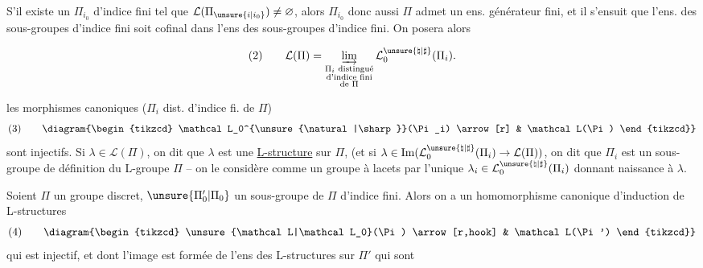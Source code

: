 S'il existe un $\Pi_{i_0}$ d'indice fini tel que
$\mathcal L(\Pi_{\unsure{i|i_0}})\ne\varnothing$, alors $\Pi_{i_0}$ donc aussi $\Pi$ admet
un ens. générateur fini, et il s'ensuit
que l'ens. des sous-groupes  d'indice fini
soit cofinal dans l'ens des sous-groupes
d'indice fini. On posera alors

\[
\text{(2)}\qquad
\mathcal L(\Pi)=
\varinjlim_{\substack{\Pi_i\text{ distingué}\\
\text{d'indice fini}\\
\text{de }\Pi}}
\mathcal L_0^{\unsure{\natural|\sharp}}(\Pi_i).
\]


les morphismes canoniques ($\Pi_i$ dist. d'indice fi.
de $\Pi$)
\[
\text{(3)}\qquad
\diagram{\begin{tikzcd}
\mathcal L_0^{\unsure{\natural|\sharp}}(\Pi_i) \arrow[r] & \mathcal L(\Pi)
\end{tikzcd}}
\]
sont injectifs. Si $\lambda\in\mathcal L(\Pi)$, on dit que
$\lambda$ est une \uline{L-structure} sur $\Pi$,
(et si
$\lambda\in\operatorname{Im}(\mathcal L_0^{\unsure{\natural|\sharp}}(\Pi_i)\to\mathcal L(\Pi))$,
on dit que $\Pi_i$ est
un sous-groupe de définition du L-groupe
$\Pi$ -- on le considère comme un
groupe à lacets par l'unique $\lambda_i\in\mathcal L_0^{\unsure{\natural|\sharp}}(\Pi_i)$
donnant naissance à $\lambda$.

Soient $\Pi$ un groupe discret, $\unsure{\Pi'_0|\Pi_0}$ un
sous-groupe de $\Pi$ d'indice fini. Alors
on a un homomorphisme canonique
d'induction de L-structures
\[
\text{(4)}\qquad
\diagram{\begin{tikzcd}
\unsure{\mathcal L|\mathcal L_0}(\Pi) \arrow[r,hook] & \mathcal L(\Pi')
\end{tikzcd}}
\]
qui est injectif, et dont l'image est formée
de l'ens des L-structures sur $\Pi'$ qui sont


